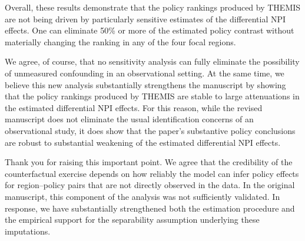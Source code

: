\documentclass[letterpaper,twoside,11pt]{reviewresponse}
\begin{document}
Overall, these results demonstrate that the policy rankings produced by THEMIS are not being driven by particularly sensitive estimates of the differential NPI effects. One can eliminate 50\% or more of the estimated policy contrast without materially changing the ranking in any of the four focal regions.

We agree, of course, that no sensitivity analysis can fully eliminate the possibility of unmeasured confounding in an observational setting. At the same time, we believe this new analysis substantially strengthens the manuscript by showing that the policy rankings produced by THEMIS are stable to large attenuations in the estimated differential NPI effects. For this reason, while the revised manuscript does not eliminate the usual identification concerns of an observational study, it does show that the paper's substantive policy conclusions are robust to substantial weakening of the estimated differential NPI effects.



 Thank you for raising this important point. We agree that the credibility of the counterfactual exercise depends on how reliably the model can infer policy effects for region--policy pairs that are not directly observed in the data. In the original manuscript, this component of the analysis was not sufficiently validated. In response, we have substantially strengthened both the estimation procedure and the empirical support for the separability assumption underlying these imputations.
 
\end{document}

